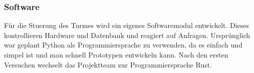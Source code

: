 \subsubsection{Software}

Für die Stuerung des Turmes wird ein eigenes Softwaremodul entwickelt. Dieses kontrollieren Hardware und Datenbank und reagiert auf Anfragen. Ursprünglich war geplant Python als Programmiersprache zu verwenden, da es einfach und simpel ist und man schnell Prototypen entwickeln kann. Nach den ersten Versuchen wechselt das Projektteam zur Programmiersprache Rust.

\clearpage


\clearpage


\clearpage


\clearpage

